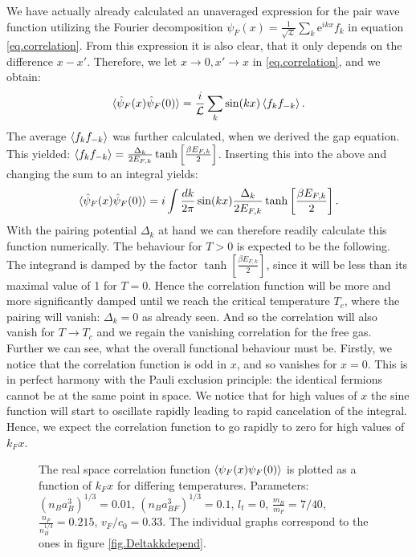 We have actually already calculated an unaveraged expression for the pair wave function utilizing the Fourier decomposition $\psi_F(x) = \frac{1}{\sqrt{\mathcal{L}}} \sum_k \text{e}^{ikx} f_k$ in equation \eqref{eq.correlation}. From this expression it is also clear, that it only depends on the difference $x-x'$. Therefore, we let $x \to 0, x' \to x$ in \eqref{eq.correlation}, and we obtain:
\begin{equation}
\braket{\hat{\psi}_F(x) \hat{\psi}_F(0)} = \frac{i}{\mathcal{L}}\sum_{k} \sin(kx)\braket{f_{k}f_{-k}}. \nonumber
\end{equation}
The average $\braket{f_{k}f_{-k}}$ was further calculated, when we derived the gap equation. This yielded: $\braket{f_{k}f_{-k}} = \frac{\Delta_k}{2E_{F,k}}\tanh\left[\frac{\beta E_{F,k} }{2}\right]$. Inserting this into the above and changing the sum to an integral yields:
\begin{equation}
\braket{\hat{\psi}_F(x) \hat{\psi}_F(0)} = i\int \frac{dk}{2\pi} \sin(kx)\frac{\Delta_k}{2E_{F,k}}\tanh\left[\frac{ \beta E_{F,k} }{2}\right].
\label{eq.pairwavefunction}
\end{equation}
With the pairing potential $\Delta_k$ at hand we can therefore readily calculate this function numerically. The behaviour for $T > 0$ is expected to be the following. The integrand is damped by the factor $\tanh\left[\frac{ \beta E_{F,k} }{2}\right]$, since it will be less than its maximal value of 1 for $T = 0$. Hence the correlation function will be more and more significantly damped until we reach the critical temperature $T_c$, where the pairing will vanish: $\Delta_k = 0$ as already seen. And so the correlation will also vanish for $T\to T_c$ and we regain the vanishing correlation for the free gas. Further we can see, what the overall functional behaviour must be. Firstly, we notice that the correlation function is odd in $x$, and so vanishes for $x = 0$. This is in perfect harmony with the Pauli exclusion principle: the identical fermions cannot be at the same point in space. We notice that for high values of $x$ the sine function will start to oscillate rapidly leading to rapid cancelation of the integral. Hence, we expect the correlation function to go rapidly to zero for high values of $k_F x$. 

\begin{figure} 
\begin{center}  
  
\caption{The real space correlation function $\braket{\psi_F(x)\psi_F(0)}$ is plotted as a function of $k_Fx$ for differing temperatures. Parameters: $(n_Ba_B^3)^{1/3} = 0.01$, $(n_Ba_{BF}^3)^{1/3} = 0.1$, $l_t = 0$, $\frac{m_B}{m_F} = 7/40$, $\frac{n_F}{n_B^{1/3}} = 0.215$, $v_F/c_0 = 0.33$. The individual graphs correspond to the ones in figure \ref{fig.Deltakkdepend}. }  
\label{fig.pairwavefunction}  
\end{center}    
\end{figure}

